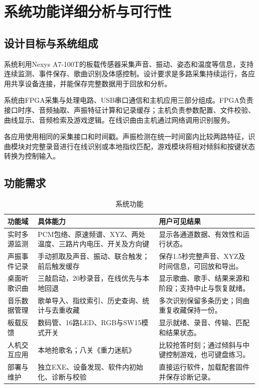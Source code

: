 \chapter{系统功能详细分析与可行性}
\section{设计目标与系统组成}
系统利用Nexys A7-100T的板载传感器采集声音、振动、姿态和温度等信息，支持连续监测、事件保存、歌曲识别及体感控制。设计要求是多路采集持续运行，各应用共享设备连接，并能保存完整数据用于回放和分析。

系统由FPGA采集与处理电路、USB串口通信和主机应用三部分组成。FPGA负责接口时序、音频抽取、声振特征计算和记录缓存；主机负责参数配置、文件校验、曲线显示、音频检索及游戏逻辑。在线识曲由主机通过网络调用识别服务。


各应用使用相同的采集接口和时间戳。声振检测在统一时间窗内比较两路特征，识曲模块对完整录音进行在线识别或本地指纹匹配，游戏模块将相对倾斜和按键状态转换为控制输入。

\section{功能需求}
\begin{table}[H]\centering\caption{系统功能}\small
\begin{tabularx}{\linewidth}{p{23mm}Y Y}\toprule
功能域 & 具体能力 & 用户可见结果\\\midrule
实时多源监测 & PCM包络、原速频谱、XYZ、两处温度、三路片内电压、开关及方向键 & 显示各通道数据、有效性和运行状态。\\
声振事件记录 & 手动抓取及声音、振动、联合触发；前后触发缓存 & 保存1.5秒完整声音、XYZ及时间信息，可回放和导出。\\
桌面听歌识曲 & 三敲启动，20秒录音，在线优先与本地回退 & 显示歌曲、歌手、结果来源和阶段；支持中止与恢复就绪。\\
音乐数据管理 & 歌单导入、指纹索引、历史查询、统计与去重收藏 & 多次识别保留多条历史；同曲重复收藏保持一份。\\
板载反馈 & 数码管、16路LED、RGB与SW15模式开关 & 显示就绪、录音、传输、匹配和结果状态。\\
人机交互应用 & 本地抢歌名；八关《重力迷航》 & 比较抢答时刻；通过倾斜与中键控制游戏，也可键盘练习。\\
部署与维护 & 独立EXE、设备发现、软件内初始化、诊断与校验 & 直接运行软件，加载配套固件并保存诊断记录。\\\bottomrule
\end{tabularx}\end{table}

